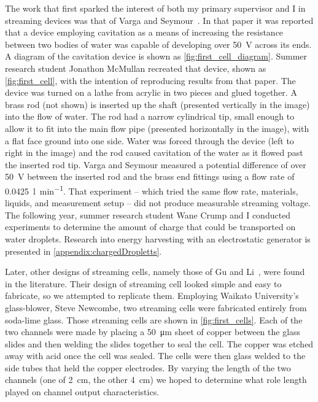     The work that first sparked the interest of both my primary supervisor and I in streaming devices was that of Varga and Seymour~\cite{Varga1986}.
    In that paper it was reported that a device employing cavitation as a means of increasing the resistance between two bodies of  water was capable of developing over \SI{50}{\volt} across its ends.
    A diagram of the cavitation device is shown as \cref{fig:first_cell_diagram}.
    Summer research student Jonathon McMullan recreated that device, shown as \cref{fig:first_cell}, with the intention of reproducing results from that paper.
    The device was turned on a lathe from acrylic in two pieces and glued together.
    A brass rod (not shown) is inserted up the shaft (presented vertically in the image) into the flow of water.
    The rod had a narrow cylindrical tip, small enough to allow it to fit into the main flow pipe (presented horizontally in the image), with a flat face ground into one side.
    Water was forced through the device (left to right in the image) and the rod caused cavitation of the water as it flowed past the inserted rod tip.
    Varga and Seymour measured a potential difference of over \SI{50}{\volt} between the inserted rod and the brass end fittings using a flow rate of \SI{0.0425}{\litre\per\minute}.
    That experiment -- which tried the same flow rate, materials, liquids, and measurement setup -- did not produce measurable streaming voltage.
    The following year, summer research student Wane Crump and I conducted experiments to determine the amount of charge that could be transported on water droplets.
    Research into energy harvesting with an electrostatic generator is presented in \cref{appendix:chargedDropletts}.

    Later, other designs of streaming cells, namely those of Gu and Li~\cite{Gu2000}, were found in the literature.
    Their design of streaming cell looked simple and easy to fabricate, so we attempted to replicate them.
    Employing Waikato University's glass-blower, Steve Newcombe, two streaming cells were fabricated entirely from soda-lime glass.
    Those streaming cells are shown in \cref{fig:first_cells}.
    Each of the two channels were made by placing a \SI{50}{\micro\meter} sheet of copper between the glass slides and then welding the slides together to seal the cell.
    The copper was etched away with acid once the cell was sealed.
    The cells were then glass welded to the side tubes that held the copper electrodes.
    By varying the length of the two channels (one of \SI{2}{\centi\meter}, the other \SI{4}{\centi\meter}) we hoped to determine what role length played on channel output characteristics.

